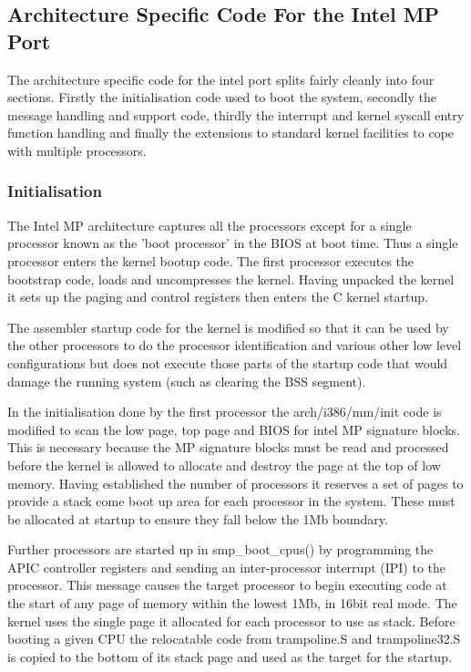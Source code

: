 \documentclass[]{article}
\begin{document}
\subsection{Architecture Specific Code For the Intel MP Port}
The architecture specific code for the intel port splits fairly cleanly 
into four sections. Firstly the initialisation code used to boot the 
system, secondly the message handling and support code, thirdly the 
interrupt and kernel syscall entry function handling and finally the 
extensions to standard kernel facilities to cope with multiple processors.

\subsubsection{Initialisation}	
The Intel MP architecture captures all the processors except for a single 
processor known as the 'boot processor' in the BIOS at boot time. Thus a 
single processor enters the kernel bootup code. The first processor 
executes the bootstrap code, loads and uncompresses the kernel. Having 
unpacked the kernel it sets up the paging and control registers then enters 
the C kernel startup.

The assembler startup code for the kernel is modified so that it can be 
used by the other processors to do the processor identification and various 
other low level configurations but does not execute those parts of the 
startup code that would damage the running system (such as clearing the BSS 
segment). 

In the initialisation done by the first processor the arch/i386/mm/init 
code is modified to scan the low page, top page and BIOS for intel MP 
signature blocks. This is necessary because the MP signature blocks must 
be read and processed before the kernel is allowed to allocate and destroy 
the page at the top of low memory. Having established the number of 
processors it reserves a set of pages to provide a stack come boot up area 
for each processor in the system. These must be allocated at startup to 
ensure they fall below the 1Mb boundary.

Further processors are started up in smp\_boot\_cpus() by programming the 
APIC controller registers and sending an inter-processor interrupt (IPI) to 
the processor. This message causes the target processor to begin executing 
code at the start of any page of memory within the lowest 1Mb, in 16bit 
real mode. The kernel uses the single page it allocated for each processor 
to use as stack. Before booting a given CPU the relocatable code from 
trampoline.S and trampoline32.S is copied to the bottom of its stack page 
and used as the target for the startup. 
\end{document}
